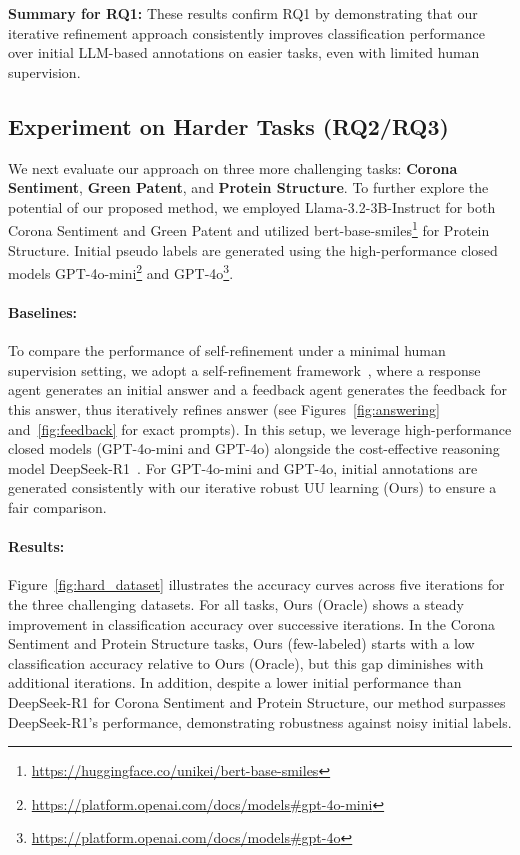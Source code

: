 \textbf{Summary for RQ1:}
These results confirm RQ1 by demonstrating that our iterative refinement approach consistently improves classification performance over initial LLM-based annotations on easier tasks, even with limited human supervision.

\subsection{Experiment on Harder Tasks (RQ2/RQ3)}
\label{subsec:hard}
We next evaluate our approach on three more challenging tasks: \textbf{Corona Sentiment}, \textbf{Green Patent}, and \textbf{Protein Structure}. To further explore the potential of our proposed method, we employed Llama-3.2-3B-Instruct for both Corona Sentiment and Green Patent and utilized bert-base-smiles\footnote{\scriptsize{\url{https://huggingface.co/unikei/bert-base-smiles}}} for Protein Structure. Initial pseudo labels are generated using the high-performance closed models GPT-4o-mini\footnote{\scriptsize{\url{https://platform.openai.com/docs/models\#gpt-4o-mini}}} and GPT-4o\footnote{\scriptsize{\url{https://platform.openai.com/docs/models\#gpt-4o}}}.

\paragraph{Baselines:}
To compare the performance of self-refinement under a minimal human supervision setting, we adopt a self-refinement framework~\citep{Madaan2023-fn,Kim2023-zz,Chen2024-zm}, where a response agent generates an initial answer and a feedback agent generates the feedback for this answer, thus iteratively refines answer (see Figures~\ref{fig:answering} and~\ref{fig:feedback} for exact prompts). In this setup, we leverage high-performance closed models (GPT-4o-mini and GPT-4o) alongside the cost-effective reasoning model DeepSeek-R1~\citep{DeepSeek-AI2025-vk}. For GPT-4o-mini and GPT-4o, initial annotations are generated consistently with our iterative robust UU learning (Ours) to ensure a fair comparison.

\paragraph{Results:}
Figure~\ref{fig:hard_dataset} illustrates the accuracy curves across five iterations for the three challenging datasets. For all tasks, Ours (Oracle) shows a steady improvement in classification accuracy over successive iterations. In the Corona Sentiment and Protein Structure tasks, Ours (few-labeled) starts with a low classification accuracy relative to Ours (Oracle), but this gap diminishes with additional iterations. In addition, despite a lower initial performance than DeepSeek-R1 for Corona Sentiment and Protein Structure, our method surpasses DeepSeek-R1's performance, demonstrating robustness against noisy initial labels.

